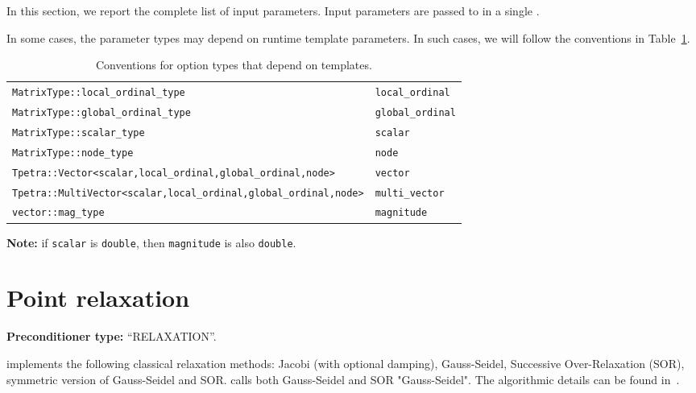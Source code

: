 \label{sec:options}
In this section, we report the complete list of input parameters. Input
parameters are passed to \ifpacktwo in a single \parameterlist.

In some cases, the parameter types may depend on runtime template parameters.
In such cases, we will follow the conventions in Table~\ref{tab:conventions}.

\begin{table}[htbp]
  \centering
  \begin{tabular}{p{13.3cm} p{2.5cm}}
    \toprule
    \verb!MatrixType::local_ordinal_type!                                  & \verb!local_ordinal! \\
    \verb!MatrixType::global_ordinal_type!                                 & \verb!global_ordinal! \\
    \verb!MatrixType::scalar_type!                                         & \verb!scalar! \\
    \verb!MatrixType::node_type!                                           & \verb!node! \\
    \verb!Tpetra::Vector<scalar,local_ordinal,global_ordinal,node>!        & \verb!vector!\\
    \verb!Tpetra::MultiVector<scalar,local_ordinal,global_ordinal,node>!   & \verb!multi_vector!\\
    \verb!vector::mag_type!                                                & \verb!magnitude! \\
    \bottomrule
  \end{tabular}
  \caption{\label{tab:conventions}Conventions for option types that depend on templates.}
\end{table}

\noindent\textbf{Note:} if \verb!scalar! is \texttt{double}, then \verb!magnitude! is also \texttt{double}.

\section{Point relaxation}\label{s:relaxation}

\textbf{Preconditioner type:} ``RELAXATION''.

\ifpacktwo{} implements the following classical relaxation methods: Jacobi (with
optional damping), Gauss-Seidel, Successive Over-Relaxation (SOR), symmetric
version of Gauss-Seidel and SOR. \ifpacktwo{} calls both Gauss-Seidel and SOR
"Gauss-Seidel". The algorithmic details can be found in~\cite{Saad2003}.

